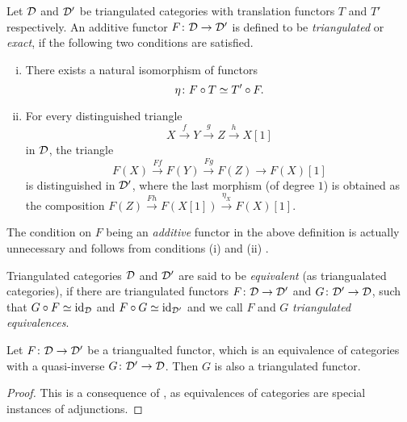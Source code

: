 \begin{definition}
    Let $\mathcal D$ and $\mathcal D'$ be triangulated categories with translation functors $T$ and $T'$ respectively. An additive functor $F \colon \mathcal D \to \mathcal D'$ is defined to be \emph{triangulated} or \emph{exact}, if the following two conditions are satisfied.
    \begin{enumerate}[(i)]
        \item There exists a natural isomorphism of functors 
        \[
            \eta \colon F \circ T \simeq T' \circ F.
        \]
        \item For every distinguished triangle
        \[
            X\xrightarrow{f} Y \xrightarrow{g} Z \xrightarrow{h} X[1]
        \]
        in $\mathcal D$, the triangle
        \[
            F(X) \xrightarrow{Ff} F(Y) \xrightarrow{Fg} F(Z) \to F(X)[1] 
        \]
        is distinguished in $\mathcal D'$, where the last morphism (of degree $1$) is obtained as the composition $F(Z) \xrightarrow{Fh} F(X[1]) \xrightarrow{\eta_X} F(X)[1]$.
    \end{enumerate}
\end{definition}

\begin{remark}
    The condition on $F$ being an \emph{additive} functor in the above definition is actually unnecessary and follows from conditions (i) and (ii) \cite[\href{https://stacks.math.columbia.edu/tag/05QY}{Tag 05QY}]{stacks-project}.
\end{remark}

\begin{definition}
    Triangulated categories $\mathcal D$ and $\mathcal D'$ are said to be \emph{equivalent} (as triangualated categories), if there are triangulated functors $F \colon \mathcal D \to \mathcal D'$ and $G \colon \mathcal D' \to \mathcal D$, such that $G \circ F \simeq \operatorname{id}_{\mathcal D}$ and $F \circ G \simeq \operatorname{id}_{\mathcal D'}$ and we call $F$ and $G$ \emph{triangulated equivalences}.
\end{definition}

\begin{proposition}
    Let $F \colon \mathcal D \to \mathcal D'$ be a triangualted functor, which is an equivalence of categories with a quasi-inverse $G \colon \mathcal D' \to \mathcal D$. Then $G$ is also a triangulated  functor. 
\end{proposition}

\begin{proof}
    This is a consequence of \cite[Proposition 1.41]{huybrechts2006fouriermukai}, as equivalences of categories are special instances of adjunctions. 
\end{proof}

